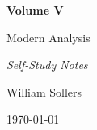 \begin{titlepage}
\centering

\vspace*{5cm}

{\Huge\bfseries Volume V\par}

\vspace{0.5cm}

{\LARGE Modern Analysis\par}

\vspace{0.5cm}

{\large\itshape Self-Study Notes\par}

\vfill

{\large William Sollers\par}

\vspace{0.5cm}

{\large \today\par}

\end{titlepage}
